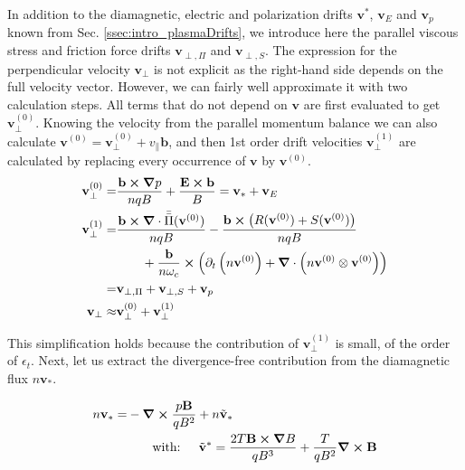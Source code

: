 In addition to the diamagnetic, electric and polarization drifts $\mathbf{v}^*$, $\mathbf{v}_E$ and $\mathbf{v}_{p}$ known from Sec. \ref{ssec:intro_plasmaDrifts}, we introduce here the parallel viscous stress and friction force drifts $\mathbf{v}_{\perp,\Pi}$ and $\mathbf{v}_{\perp,S}$. The expression for the perpendicular velocity $\mathbf{v}_\perp$ is not explicit as the right-hand side depends on the full velocity vector. However, we can fairly well approximate it with two calculation steps. All terms that do not depend on $\textbf{v}$ are first evaluated to get $\mathbf{v}_\perp^{(0)}$. Knowing the velocity from the parallel momentum balance we can also calculate $\mathbf{v}^{(0)} = \mathbf{v}_\perp^{(0)}+v_\parallel \mathbf{b}$, and then 1st order drift velocities $\mathbf{v}_\perp^{(1)}$ are calculated by replacing every occurrence of $\mathbf{v}$ by $\mathbf{v}^{(0)}$. 
\begin{align}
	\mathbf{v}_\perp^{(0)} =& \frac{\mathbf{b}\cross\grad p}{nqB} + \frac{\mathbf{E}\cross\mathbf{b}}{B} = \mathbf{v}_* + \mathbf{v}_E \label{eq:VelPerp0Component} \\	
	\mathbf{v}_\perp^{(1)} =& \frac{\mathbf{b}\cross\grad\cdot\bar{\bar{\Pi}}(\mathbf{v}^{(0)})}{nqB} - \frac{\mathbf{b}\cross\left(R(\mathbf{v}^{(0)})+S(\mathbf{v}^{(0)})\right)}{nqB} \nonumber\\ & \qquad + \frac{\mathbf{b}}{n\omega_c} \cross \left(\partial_t \left(n\mathbf{v}^{(0)}\right) + \grad\cdot\left(n\mathbf{v}^{(0)}\otimes\mathbf{v}^{(0)}\right)\right) \nonumber \\
	=& \mathbf{v}_{\perp,\Pi} + \mathbf{v}_{\perp,S} + \mathbf{v}_{p} \label{eq:VelPerp1Component} \\
	\mathbf{v}_\perp \approx& \mathbf{v}_\perp^{(0)} + \mathbf{v}_\perp^{(1)}
\end{align}

This simplification holds because the contribution of $\mathbf{v}_\perp^{(1)}$ is small, of the order of $\epsilon_t$. Next, let us extract the divergence-free contribution from the diamagnetic flux $n\mathbf{v}_*$.

\begin{align}
	\label{eq:definitionDiamagneticDrift}
	n\mathbf{v}_* =& -\grad \cross \frac{p\mathbf{B}}{qB^2} + n\tilde{\mathbf{v}}_* \nonumber\\
	& \qquad\text{with: }\quad \tilde{\mathbf{v}}^* = \frac{2T\mathbf{B}\cross\grad B}{qB^3} + \frac{T}{qB^2}\grad\cross\mathbf{B}
\end{align}

